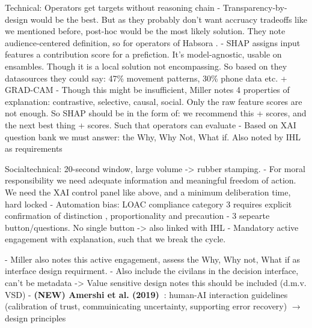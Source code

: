 Technical:
Operators get targets without reasoning chain
- Transparency-by-design would be the best. But as they probably don't want accruacy tradeoffs like we mentioned before, post-hoc would be the most likely solution. They note audience-centered definition, so for operators of Habsora \cite{arrieta2019explainableartificialintelligencexai}.
- SHAP assigns input features a contribution score for a prefiction. It's model-agnostic, usable on ensambles. Though it is a local solution not encompassing. So based on they datasources they could say: 47\% movement patterns, 30\% phone data etc.   + GRAD-CAM\cite{lundberg2017unifiedapproachinterpretingmodel}
- Though this might be insufficient, Miller notes 4 properties of explanation: contrastive, selective, causal, social. Only the raw feature scores are not enough. So SHAP should be in the form of: we recommend this + scores, and the next best thing + scores. Such that operators can evaluate \cite{miller2018explanationartificialintelligenceinsights}
- Based on XAI question bank we must answer: the Why, Why Not, What if. Also noted by IHL as requirements \cite{liao2020questioning}

Socialtechnical:
20-second window, large volume -> rubber stamping. 
- For moral responsibility we need adequate information and meaningful freedom of action. We need the XAI control panel like above, and a minimum deliberation time, hard locked \cite{mhcof}
- Automation bias: LOAC compliance category 3 requires explicit confirmation of distinction , proportionality and precaution - 3 sepearte button/questions. No single button -> also linked with IHL \cite{aimag.v40i1.2848}
- Mandatory active engagement with explanation, such that we break the cycle. \cite{parasuraman2010complacency}

- Miller also notes this active engagement, assess the Why, Why not, What if as interface design requirment.
- Also include the civilans in the decision interface, can't be metadata -> Value sensitive design notes this should be included \cite{friedman2013vsd} (d.m.v. VSD)
- \textbf{(NEW) Amershi et al. (2019)~\citep{amershi2019guidelines}}: human-AI interaction guidelines (calibration of trust, commuinicating uncertainty, supporting error recovery) $\rightarrow$ design principles

